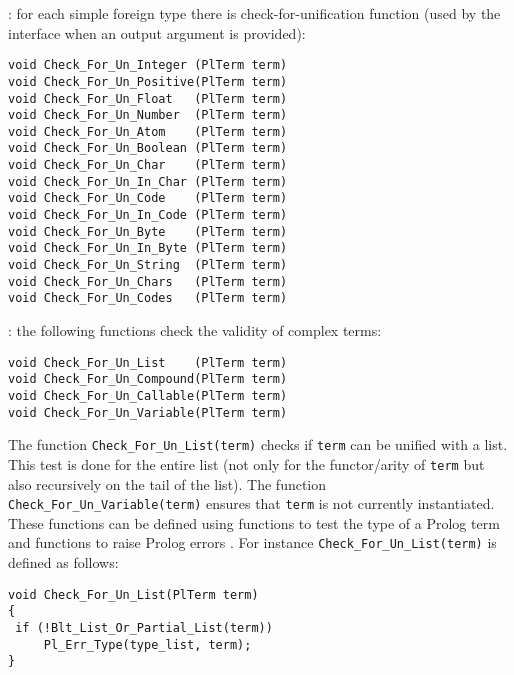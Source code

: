 : for each simple foreign type
 there is check-for-unification function (used
by the interface when an output argument is provided):

\begin{Indentation}
\begin{verbatim}
void Check_For_Un_Integer (PlTerm term)
void Check_For_Un_Positive(PlTerm term)
void Check_For_Un_Float   (PlTerm term)
void Check_For_Un_Number  (PlTerm term)
void Check_For_Un_Atom    (PlTerm term)
void Check_For_Un_Boolean (PlTerm term)
void Check_For_Un_Char    (PlTerm term)
void Check_For_Un_In_Char (PlTerm term)
void Check_For_Un_Code    (PlTerm term)
void Check_For_Un_In_Code (PlTerm term)
void Check_For_Un_Byte    (PlTerm term)
void Check_For_Un_In_Byte (PlTerm term)
void Check_For_Un_String  (PlTerm term)
void Check_For_Un_Chars   (PlTerm term)
void Check_For_Un_Codes   (PlTerm term)
\end{verbatim}
\end{Indentation}

: the following functions check the validity of
complex terms:

\begin{Indentation}
\begin{verbatim}
void Check_For_Un_List    (PlTerm term)
void Check_For_Un_Compound(PlTerm term)
void Check_For_Un_Callable(PlTerm term)
void Check_For_Un_Variable(PlTerm term)
\end{verbatim}
\end{Indentation}

The function \texttt{Check\_For\_Un\_List(term)} checks if \texttt{term} can
be unified with a list. This test is done for the entire list (not only for
the functor/arity of \texttt{term} but also recursively on the tail of the
list). The function \texttt{Check\_For\_Un\_Variable(term)} ensures that
\texttt{term} is not currently instantiated. These functions can be defined
using functions to test the type of a Prolog term  and functions to raise Prolog errors . For instance \texttt{Check\_For\_Un\_List(term)} is defined
as follows:

\begin{Indentation}
\begin{verbatim}
void Check_For_Un_List(PlTerm term)
{
 if (!Blt_List_Or_Partial_List(term))
     Pl_Err_Type(type_list, term);
}
\end{verbatim}
\end{Indentation}

